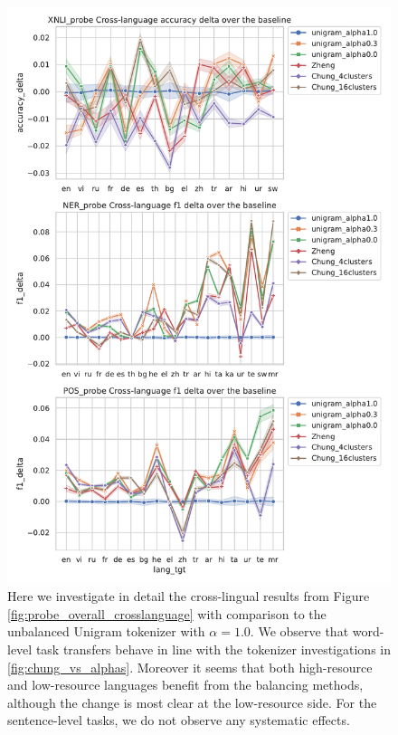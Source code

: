 \begin{figure}[H]
    \centering
    \includegraphics[width=\textwidth]{figures/probe_detailed_crosslanguage_over_baseline_lang_tgt.pdf}
    \caption{Here we investigate in detail the cross-lingual results from Figure \ref{fig:probe_overall_crosslanguage} with comparison to the unbalanced Unigram tokenizer with $\alpha=1.0$. We observe that word-level task transfers behave in line with the tokenizer investigations in \ref{fig:chung_vs_alphas}. Moreover it seems that both high-resource and low-resource languages benefit from the balancing methods, although the change is most clear at the low-resource side. For the sentence-level tasks, we do not observe any systematic effects.}
    \label{fig:probe_overall_crosslanguage_over_baseline}
\end{figure}



